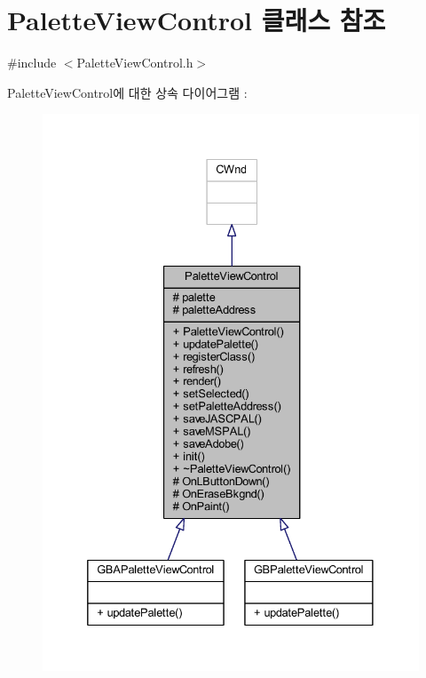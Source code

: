 \hypertarget{class_palette_view_control}{}\section{Palette\+View\+Control 클래스 참조}
\label{class_palette_view_control}


{\ttfamily \#include $<$Palette\+View\+Control.\+h$>$}



Palette\+View\+Control에 대한 상속 다이어그램 \+: \nopagebreak
\begin{figure}[H]
\begin{center}
\leavevmode
\includegraphics[width=332pt]{class_palette_view_control__inherit__graph}
\end{center}
\end{figure}



